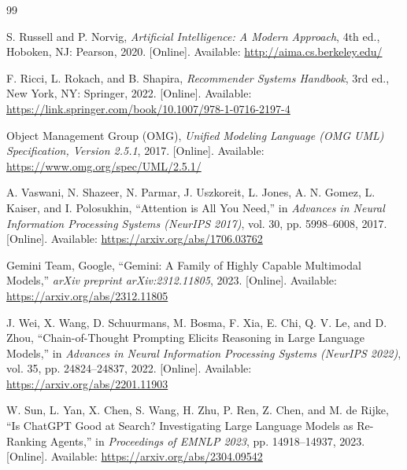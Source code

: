\documentclass[12pt,a4paper]{report}
\begin{document}






\cleardoublepage
{}

\begin{thebibliography}{99}


S. Russell and P. Norvig, 
\textit{Artificial Intelligence: A Modern Approach}, 4th ed., 
Hoboken, NJ: Pearson, 2020. 
[Online]. Available: \url{http://aima.cs.berkeley.edu/}

F. Ricci, L. Rokach, and B. Shapira, 
\textit{Recommender Systems Handbook}, 3rd ed., 
New York, NY: Springer, 2022. 
[Online]. Available: \url{https://link.springer.com/book/10.1007/978-1-0716-2197-4}

Object Management Group (OMG), 
\textit{Unified Modeling Language (OMG UML) Specification, Version 2.5.1}, 
2017. 
[Online]. Available: \url{https://www.omg.org/spec/UML/2.5.1/}


A. Vaswani, N. Shazeer, N. Parmar, J. Uszkoreit, L. Jones, A. N. Gomez, L. Kaiser, and I. Polosukhin, 
``Attention is All You Need,'' 
in \textit{Advances in Neural Information Processing Systems (NeurIPS 2017)}, vol. 30, pp. 5998--6008, 2017. 
[Online]. Available: \url{https://arxiv.org/abs/1706.03762}

Gemini Team, Google, 
``Gemini: A Family of Highly Capable Multimodal Models,'' 
\textit{arXiv preprint arXiv:2312.11805}, 2023. 
[Online]. Available: \url{https://arxiv.org/abs/2312.11805}

J. Wei, X. Wang, D. Schuurmans, M. Bosma, F. Xia, E. Chi, Q. V. Le, and D. Zhou, 
``Chain-of-Thought Prompting Elicits Reasoning in Large Language Models,'' 
in \textit{Advances in Neural Information Processing Systems (NeurIPS 2022)}, vol. 35, pp. 24824--24837, 2022. 
[Online]. Available: \url{https://arxiv.org/abs/2201.11903}

W. Sun, L. Yan, X. Chen, S. Wang, H. Zhu, P. Ren, Z. Chen, and M. de Rijke, 
``Is ChatGPT Good at Search? Investigating Large Language Models as Re-Ranking Agents,'' 
in \textit{Proceedings of EMNLP 2023}, pp. 14918--14937, 2023. 
[Online]. Available: \url{https://arxiv.org/abs/2304.09542}


\end{thebibliography}
\end{document}
